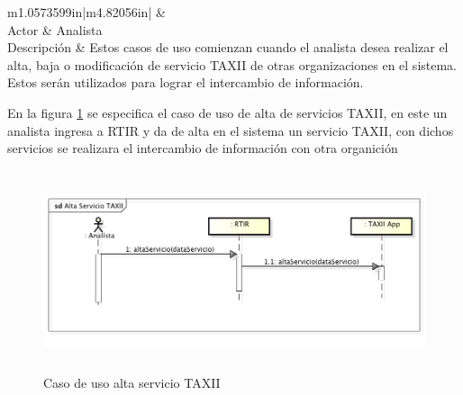 \bigskip

\begin{flushleft}
	\tablefirsthead{}
	\tablehead{}
	\tabletail{}
	\tablelasttail{}
	\begin{supertabular}{m{1.0573599in}|m{4.82056in}|}
		 &
		\\\hline
		{Actor} &
		{Analista}\\
		{Descripción} &
		{Estos casos de uso comienzan cuando el analista desea realizar el alta, baja o
			modificación de servicio TAXII de otras organizaciones en el sistema. Estos serán utilizados para lograr el intercambio
			de información.}\\\hhline{~-}
	\end{supertabular}
\end{flushleft}

\bigskip
	En la figura \ref{fig.altaserviciotaxii} se especifica el caso de uso de alta de servicios TAXII, en este un analista ingresa a RTIR y da de alta
	en el sistema un servicio TAXII, con dichos servicios se realizara el intercambio de información con otra organición

\begin{figure}[H]
	\centering
	\includegraphics[width=5.7638in,height=2.3217in]{Analisis22-img/Analisis22-img023.png} 
	\caption{Caso de uso alta servicio TAXII}
	\label{fig.altaserviciotaxii}
\end{figure}

\bigskip

